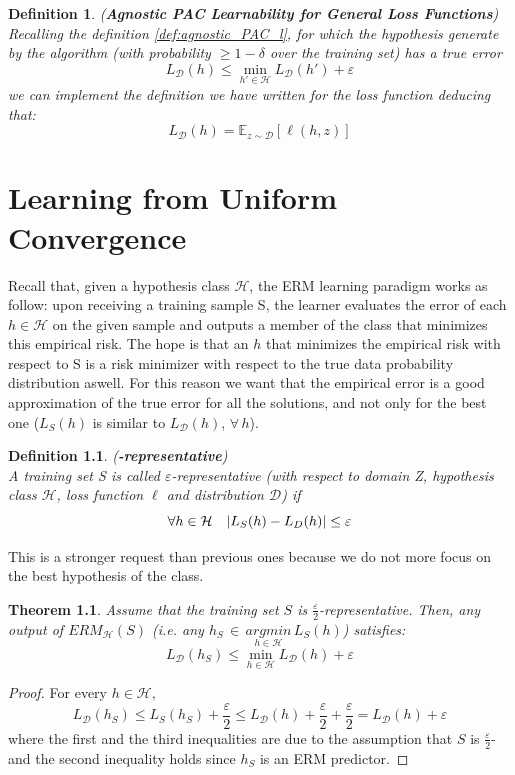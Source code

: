 \documentclass[12pt]{report}
\theoremstyle{plain}
\newtheorem{theorem}{Theorem}[chapter]
\newtheorem{definition}{Definition}[chapter]
\newcommand\mcl[1]{\mathcal{#1}}
\begin{document}
\begin{flushleft}
\begin{definition} (\textbf{Agnostic PAC Learnability for General Loss 
Functions})\\
Recalling the definition \ref{def:agnostic_PAC_l}, for which the hypothesis generate by the algorithm (with probability $\geq 1-\delta$ over the training set) has a true error
\[ L_\mcl{D}(h)\leq\min_{h'\in\mcl{H}}L_\mcl{D}(h')+\varepsilon \]
we can implement the definition we have written for the loss function deducing that:
\[ L_\mcl{D}(h) = \mathds{E}_{z\sim\mcl{D}}\left[\ell(h,z)\right] \]
\label{def:agnosticPAC_general_loss}
\end{definition}


\chapter{Learning from Uniform Convergence}

Recall that, given a hypothesis class $\mcl{H}$, the ERM learning paradigm works as follow: upon receiving a training sample S, the learner evaluates the error of each $h\in\mcl{H}$ on the given sample and outputs a member of the class that minimizes this empirical risk. The hope is that an $h$ that minimizes the empirical risk with respect to S is a risk minimizer with respect to the true data probability distribution aswell. For this reason we want that the empirical error is a good approximation of the true error for all the solutions, and not only for the best one ($L_S(h)$ is similar to $L_\mcl{D}(h)$, $\forall\, h$).\\
\begin{definition} (\bm{$\varepsilon$}\textbf{-representative})\\
A training set S is called $\varepsilon$-representative (with respect to domain Z, hypothesis class $\mcl{H}$, loss function $\ell$ and distribution $\mcl{D}$) if 
\[ \forall h\in\mcl{H} \quad \abs{L_S(h)-L_D(h)}\leq\varepsilon \]
\end{definition}  

This is a stronger request than previous ones because we do not more focus on the best hypothesis of the class.\\

\begin{theorem}
	Assume that the training set $S$ is $\frac{\varepsilon}{2}$-representative. Then, any output of $ERM_\mcl{H}(S)$ (i.e. any $h_S\,\in\,\underset{h\in\mcl{H}}{argmin}\, L_S(h)$) satisfies:
	\[ L_\mcl{D}(h_S)\leq\min_{h\in\mcl{H}} L_\mcl{D}(h)+\varepsilon  \]
\end{theorem} 
\begin{proof}
	For every $h\in\mcl{H},$
	\[ L_\mcl{D}(h_S)\leq L_S(h_S)+\frac{\varepsilon}{2}\leq L_\mcl{D}(h)+\frac{\varepsilon}{2}+\frac{\varepsilon}{2} = L_\mcl{D}(h) + \varepsilon\]
	where the first and the third inequalities are due to the assumption that $S$ is $\frac{\varepsilon}{2}$- and the second inequality holds since $h_S$ is an ERM predictor. 
\end{proof}


\end{flushleft}
\end{document}
